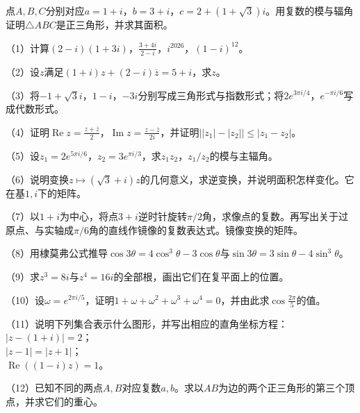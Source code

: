 \begin{example}
点\(A , B , C\)分别对应\(a = 1 + i\)，\(b = 3 + i\)，\(c = 2 + \left( 1 + \sqrt{3} \right) i\)。用复数的模与辐角证明\(\triangle A B C\)是正三角形，并求其面积。
\end{example}
\begin{exercise}
（1）计算\(\left( 2 - i \right) \left( 1 + 3 i \right)\)，\(\frac{3 + 4 i}{2 - i}\)，\(i^{2026}\)，\(\left( 1 - i \right)^{12}\)。

（2）设\(z\)满足\(\left( 1 + i \right) z + \left( 2 - i \right) \overline{z} = 5 + i\)，求\(z\)。

（3）将\(- 1 + \sqrt{3} i\)，\(1 - i\)，\(- 3 i\)分别写成三角形式与指数形式；将\(2 e^{3 \pi i / 4}\)，\(e^{- \pi i / 6}\)写成代数形式。

（4）证明\(\operatorname{Re} z = \frac{z + \overline{z}}{2}\)，\(\operatorname{Im} z = \frac{z - \overline{z}}{2 i}\)，并证明\(\left| \left| z_{1} \right| - \left| z_{2} \right| \right| \le \left| z_{1} - z_{2} \right|\)。

（5）设\(z_{1} = 2 e^{5 \pi i / 6}\)，\(z_{2} = 3 e^{\pi i / 3}\)，求\(z_{1} z_{2}\)，\(z_{1} / z_{2}\)的模与主辐角。

（6）说明变换\(z \mapsto \left( \sqrt{3} + i \right) z\)的几何意义，求逆变换，并说明面积怎样变化。它在基\(1 , i\)下的矩阵。

（7）以\(1 + i\)为中心，将点\(3 + i\)逆时针旋转\(\pi / 2\)角，求像点的复数。再写出关于过原点、与实轴成\(\pi / 6\)角的直线作镜像的复数表达式。镜像变换的矩阵。

（8）用棣莫弗公式推导\(\cos 3 \theta = 4 \cos^{3} \theta - 3 \cos \theta\)与\(\sin 3 \theta = 3 \sin \theta - 4 \sin^{3} \theta\)。

（9）求\(z^{3} = 8 i\)与\(z^{4} = 16 i\)的全部根，画出它们在复平面上的位置。

（10）设\(\omega = e^{2 \pi i / 5}\)，证明\(1 + \omega + \omega^{2} + \omega^{3} + \omega^{4} = 0\)，并由此求\(\cos \frac{2 \pi}{5}\)的值。

（11）说明下列集合表示什么图形，并写出相应的直角坐标方程：\\
\(\left| z - \left( 1 + i \right) \right| = 2\)；\\
\(\left| z - 1 \right| = \left| z + 1 \right|\)；\\
\(\operatorname{Re} \left( \left( 1 - i \right) z \right) = 1\)。

（12）已知不同的两点\(A , B\)对应复数\(a , b\)。求以\(A B\)为边的两个正三角形的第三个顶点，并求它们的重心。


\end{exercise}
